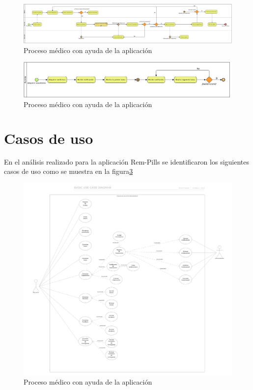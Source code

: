 \begin{figure}[htb]
	\centering
	\includegraphics[width=1.1\textwidth]{images/cap2/Proceso2}
	\caption{Proceso médico con ayuda de la aplicación} \label{fig:proceso2}
\end{figure}

\begin{figure}[htb]
	\centering
	\includegraphics[width=1.1\textwidth]{images/cap2/AdquiereTratamientoP2}
	\caption{Proceso médico con ayuda de la aplicación} \label{fig:subproceso2}
\end{figure}


\section{Casos de uso}
En el análisis realizado para la aplicación Rem-Pills se identificaron los siguientes casos de uso como se muestra en la figura\ref{fig:casosdeuso}

\begin{figure}[htb]
	\centering
	\includegraphics[width=1.1\textwidth]{images/cap2/casosdeuso}
	\caption{Proceso médico con ayuda de la aplicación} \label{fig:casosdeuso}
\end{figure} 

